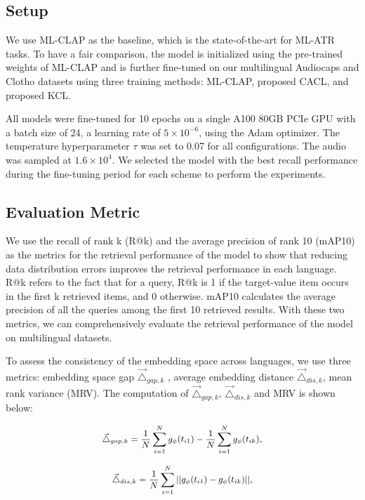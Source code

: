 \subsection{Setup}
We use ML-CLAP \cite{yan2024bridging} as the baseline, which is the state-of-the-art for ML-ATR tasks. To have a fair comparison, the model is initialized using the pre-trained weights of ML-CLAP and is further fine-tuned on our multilingual Audiocaps and Clotho datasets using three training methods: ML-CLAP, proposed CACL, and proposed KCL.

All models were fine-tuned for 10 epochs on a single A100 80GB PCIe GPU with a batch size of 24, a learning rate of $5 \times 10^{-6}$, using the Adam optimizer. The temperature hyperparameter $\tau$ was set to 0.07 for all configurations. The audio was sampled at $1.6\times 10^{4}$. We selected the model with the best recall performance during the fine-tuning period for each scheme to perform the experiments.

\subsection{Evaluation Metric}
We use the recall of rank k (R@k) and the average precision of rank 10 (mAP10) as the metrics for the retrieval performance of the model to show that reducing data distribution errors improves the retrieval performance in each language. R@k refers to the fact that for a query, R@k is 1 if the target-value item occurs in the first k retrieved items, and 0 otherwise. mAP10 calculates the average precision of all the queries among the first 10 retrieved results. With these two metrics, we can comprehensively evaluate the retrieval performance of the model on multilingual datasets. 

To assess the consistency of the embedding space across languages, we use three metrics: embedding space gap $\vec{\triangle}_{gap,k}$ \cite{liang2022mind}, average embedding distance $\vec{\triangle}_{dis,k}$, mean rank variance (MRV). The computation of $\vec{\triangle}_{gap,k}$, $\vec{\triangle}_{dis,k}$ and MRV is shown below:


\begin{equation}
\small
    \begin{aligned}
        \vec{\triangle}_{gap,k}=\frac 1 N \sum^N_{i=1}g_\phi(t_{i1})-\frac 1 N \sum^N_{i=1}g_\phi(t_{ik}),
    \end{aligned}
\end{equation}

\begin{equation}
\small
    \begin{aligned}
        \vec{\triangle}_{dis,k}=\frac 1 N \sum^N_{i=1}||g_\phi(t_{i1})-g_\phi(t_{ik})||,
    \end{aligned}
\end{equation}

